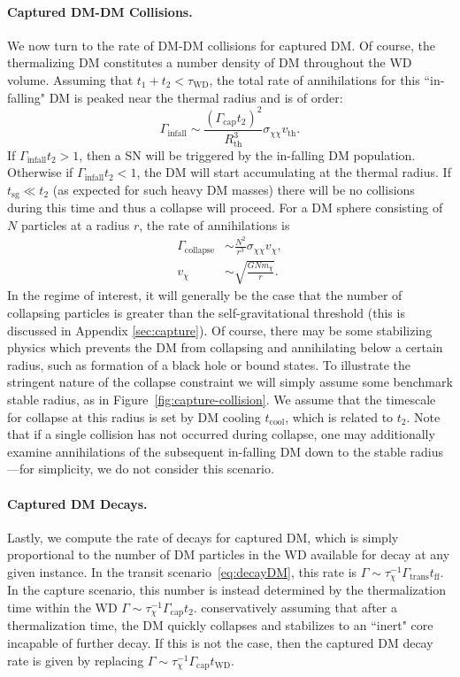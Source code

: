 \documentclass[preprintnumbers,amsmath,amssymb,prd,superscriptaddress]{revtex4}
\newcommand{\x}[1]{\ensuremath{\text{#1}}} %
\begin{document}
\paragraph{Captured DM-DM Collisions.}
We now turn to the rate of DM-DM collisions for captured DM.
Of course, the thermalizing DM constitutes a number density of DM throughout the WD volume.
Assuming that $t_1 + t_2 < \tau_\text{WD}$, the total rate of annihilations for this ``in-falling" DM is peaked near the thermal radius and is of order:
\begin{equation}
\label{eq:infall}
\Gamma_\text{infall} \sim \frac{(\Gamma_\text{cap} t_2)^2}{R_\text{th}^3} \sigma_{\chi \chi} v_\text{th}.
\end{equation}
If $\Gamma_\text{infall} t_2 > 1$, then a SN will be triggered by the in-falling DM population.
Otherwise if $\Gamma_\text{infall} t_2 < 1$, the DM will start accumulating at the thermal radius.
If $t_\text{sg} \ll t_2$ (as expected for such heavy DM masses) there will be no collisions during this time and thus a collapse will proceed.
For a DM sphere consisting of $N$ particles at a radius $r$, the rate of annihilations is
\begin{align}
\label{eq:collapse}
\Gamma_\text{collapse} &\sim \frac{N^2}{r^3} \sigma_{\chi \chi} v_\chi, \\
 v_\chi &\sim \sqrt{\frac{G N m_\chi}{r}}.
\end{align}
In the regime of interest, it will generally be the case that the number of collapsing particles is greater than the self-gravitational threshold (this is discussed in Appendix \ref{sec:capture}). 
Of course, there may be some stabilizing physics which prevents the DM from collapsing and annihilating below a certain radius, such as formation of a black hole or bound states.
To illustrate the stringent nature of the collapse constraint we will simply assume some benchmark stable radius, as in Figure~\ref{fig:capture-collision}.
We assume that the timescale for collapse at this radius is set by DM cooling $t_\x{cool}$, which is related to $t_2$. 
Note that if a single collision has not occurred during collapse, one may additionally examine annihilations of the subsequent in-falling DM down to the stable radius---for simplicity, we do not consider this scenario.

\paragraph{Captured DM Decays.}
Lastly, we compute the rate of decays for captured DM, which is simply proportional to the number of DM particles in the WD available for decay at any given instance.
In the transit scenario~\eqref{eq:decayDM}, this rate is $\Gamma \sim \tau_\chi^{-1} \Gamma_\text{trans} t_\text{ff}$.
In the capture scenario, this number is instead determined by the thermalization time within the WD $\Gamma \sim \tau_\chi^{-1} \Gamma_\text{cap} t_2$. 
conservatively assuming that after a thermalization time, the DM quickly collapses and stabilizes to an ``inert" core incapable of further decay.
If this is not the case, then the captured DM decay rate is given by replacing $\Gamma \sim \tau_\chi^{-1} \Gamma_\text{cap} t_\text{WD}$.
\end{document}
